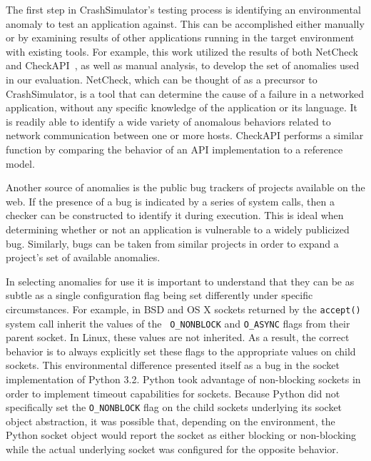     The first step in CrashSimulator's testing process is identifying an
    environmental anomaly to test an application against. 
    This can be accomplished either manually or by
    examining results of other applications running in the target environment with existing
    tools.  For example, this work utilized the results of both
    NetCheck~\cite{Zhuang_NSDI_2014} and CheckAPI~\cite{rasley2015detecting}, as
    well as manual analysis, to develop the set of anomalies used in our
    evaluation.  NetCheck, which can be thought of as a precursor to
    CrashSimulator, is a tool that can determine the cause of a failure in a
    networked application, without any specific knowledge of the application or
    its language. It is readily able to identify a wide variety of anomalous
    behaviors related to network communication between one or more
    hosts.  CheckAPI performs a similar function by comparing the behavior of an API
    implementation to a reference model.

    Another source of anomalies is the public bug trackers of projects available
    on the web.  If the presence of a bug is indicated by a series of system
    calls, then a checker can be constructed to identify it during execution. This
    is ideal when determining whether or not an application is vulnerable to a
    widely publicized bug.  Similarly, bugs can be taken from similar projects
    in order to expand a project's set of available anomalies.

    In selecting anomalies for use it is important to understand that they
    can be as subtle as a single configuration flag being set
    differently under specific circumstances.  For example, in BSD and OS X sockets returned
    by the {\tt accept()} system call inherit the values of the {\tt
      O\_NONBLOCK} and {\tt O\_ASYNC} flags from their parent socket.  In Linux,
    these values are not inherited.  As a result, the correct behavior is to
    always explicitly set these flags to the appropriate values on child
    sockets.  This environmental difference presented itself as a bug
    in the socket implementation of Python 3.2.  Python took advantage of
    non-blocking sockets in order to implement timeout capabilities for sockets.
    Because Python did not specifically set the {\tt O\_NONBLOCK} flag on the
    child sockets underlying its socket object abstraction, it was possible that,
    depending on the environment, the Python socket object would report the
    socket as either blocking or non-blocking while the actual underlying socket
    was configured for the opposite behavior.

